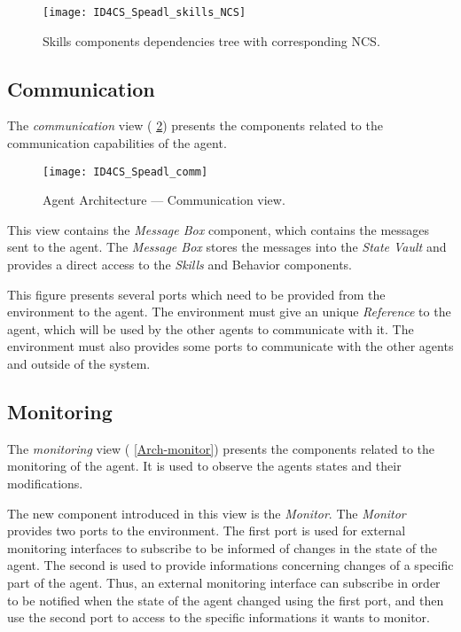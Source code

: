 \begin{figure}
\centering
\texttt{[image: ID4CS\_Speadl\_skills\_NCS]}
\caption{Skills components dependencies tree with corresponding NCS.}\label{skills:NCS}
\end{figure}

\subsection{Communication}

The \emph{communication} view (\figurename{} \ref{Arch-comm}) presents the components related to the communication capabilities of the agent. 

\begin{figure}
\centering
\texttt{[image: ID4CS\_Speadl\_comm]}
\caption{Agent Architecture --- Communication view.}
\label{Arch-comm}
\end{figure}

This view contains the \emph{Message Box} component, which contains the messages sent to the agent. The \emph{Message Box} stores the messages into the \emph{State Vault} and provides a direct access to the \emph{Skills} and {Behavior} components.

This figure presents several ports which need to be provided from the environment to the agent. The environment must give an unique \emph{Reference} to the agent, which will be used by the other agents to communicate with it. The environment must also provides some ports to communicate with the other agents and outside of the system.

\subsection{Monitoring}

The \emph{monitoring} view (\figurename{} \ref{Arch-monitor}) presents the components related to the monitoring of the agent. It is used to observe the agents states and their modifications.

The new component introduced in this view is the \emph{Monitor}. The \emph{Monitor} provides two ports to the environment. The first port is used for external monitoring interfaces to subscribe to be informed of changes in the state of the agent. The second is used to provide informations concerning changes of a specific part of the agent. Thus, an external monitoring interface can subscribe in order to be notified when the state of the agent changed using the first port, and then use the second port to access to the specific informations it wants to monitor.

